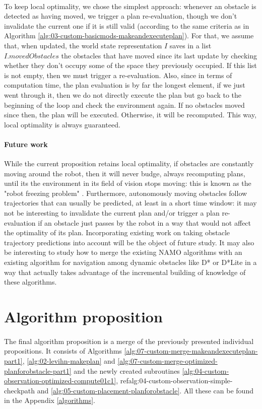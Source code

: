 \paragraph{} To keep local optimality, we chose the simplest approach: whenever an obstacle is detected as having moved, we trigger a plan re-evaluation, though we don't invalidate the current one if it is still valid (according to the same criteria as in Algorithm  \ref{alg:03-custom-basicmods-makeandexecuteplan}). For that, we assume that, when updated, the world state representation $I$ saves in a list $I.movedObstacles$ the obstacles that have moved since its last update by checking whether they don't occupy some of the space they previously occupied. If this list is not empty, then we must trigger a re-evaluation. Also, since in terms of computation time, the plan evaluation is by far the longest element, if we just went through it, then we do not directly execute the plan but go back to the beginning of the loop and check the environment again. If no obstacles moved since then, the plan will be executed. Otherwise, it will be recomputed. This way, local optimality is always guaranteed.

\paragraph{Future work} While the current proposition retains local optimality, if obstacles are constantly moving around the robot, then it will never budge, always recomputing plans, until its the environment in its field of vision stops moving: this is known as the "robot freezing problem" \parencite{trautman_unfreezing_2010}. Furthermore, autonomously moving obstacles follow trajectories that can usually be predicted, at least in a short time window: it may not be interesting to invalidate the current plan and/or trigger a plan re-evaluation if an obstacle just passes by the robot in a way that would not affect the optimality of its plan. Incorporating existing work on taking obstacle trajectory predictions into account will be the object of future study. It may also be interesting to study how to merge the existing NAMO algorithms with an existing algorithm for navigation among dynamic obstacles like D* or D*Lite in a way that actually takes advantage of the incremental building of knowledge of these algorithms.

\section{Algorithm proposition}\label{merged_proposition_section}

\paragraph{} The final algorithm proposition is a merge of the previously presented individual propositions. It consists of Algorithms \ref{alg:07-custom-merge-makeandexecuteplan-part1}, \ref{alg:02-levihn-makeplan} and \ref{alg:07-custom-merge-optimized-planforobstacle-part1} and the newly created subroutines \ref{alg:04-custom-observation-optimized-compute01c1}, ref{alg:04-custom-observation-simple-checkpath} and \ref{alg:05-custom-placement-planforobstacle}. All these can be found in the Appendix \ref{algorithms}.
